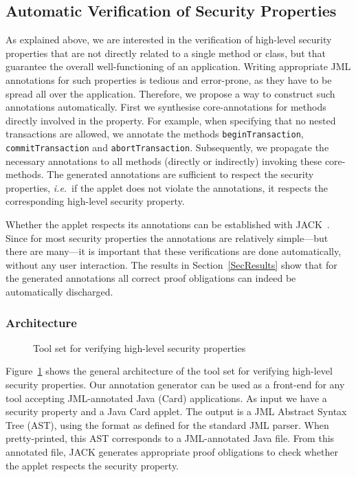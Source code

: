 \subsection{Automatic Verification of Security Properties}\label{SecVerif}

As explained above, we are interested in the verification of
high-level security properties that are not directly related to a
single method or class, but that guarantee the overall
well-functioning of an application. Writing appropriate JML
annotations for such properties is tedious and error-prone, as they
have to be spread all over the application. Therefore, we propose a
way to construct such annotations automatically. First we synthesise
core-annotations for methods directly involved in the property.  For
example, when specifying that no nested transactions are allowed, we
annotate the methods \texttt{beginTransaction},
\texttt{commitTransaction} and
\texttt{abortTransaction}. Subsequently, we propagate the necessary 
annotations to all methods (directly or indirectly) invoking these
core-methods.  The generated annotations are sufficient to respect the
security properties, \emph{i.e.}~if the applet does not violate the
annotations, it respects the corresponding high-level security
property.

Whether the applet respects its annotations can be established with
JACK~\cite{BRL-JACK}.
Since
for most security properties the annotations are relatively
simple---but there are many---it is important that these verifications
are done automatically, without any user interaction. The results in
Section~\ref{SecResults} show that for the generated annotations all
correct proof obligations can indeed be automatically discharged.

\subsubsection{Architecture}

\begin{figure}[p]
\begin{center}
\end{center}
\caption{Tool set for verifying high-level security properties}\label{FigArch}
\end{figure}



Figure~\ref{FigArch} shows the general architecture of the tool set
for verifying high-level security properties. Our annotation generator
can be used as a front-end for any tool accepting JML-annotated Java
(Card) applications. As input we have a security property and a Java
Card applet. The output is a JML Abstract Syntax Tree (AST), using the
format as defined for the standard JML parser. When pretty-printed,
this AST corresponds to a JML-annotated Java file. From this
annotated file, JACK generates appropriate proof obligations to check
whether the applet respects the security property.

